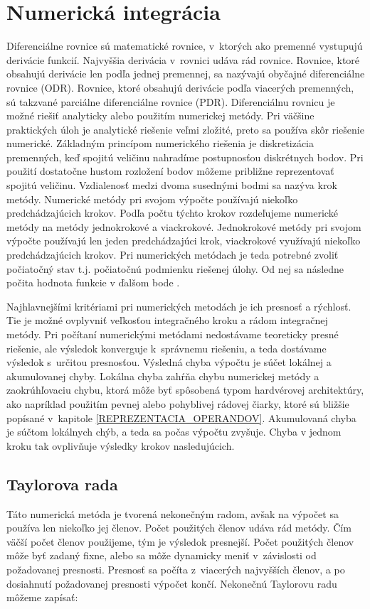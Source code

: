 \chapter{Numerická integrácia} \label{NUM_INTEGRACIA}


Diferenciálne rovnice sú matematické rovnice, v~ktorých ako premenné vystupujú derivácie funkcií. Najvyššia derivácia v~rovnici udáva rád rovnice. Rovnice, ktoré obsahujú derivácie len podľa jednej premennej, sa nazývajú obyčajné diferenciálne rovnice (ODR). Rovnice, ktoré obsahujú derivácie podľa viacerých premenných, sú takzvané parciálne diferenciálne rovnice (PDR).
Diferenciálnu rovnicu je možné riešiť analyticky alebo použitím numerickej metódy. Pri väčšine praktických úloh je analytické riešenie veľmi zložité, preto sa používa skôr riešenie numerické. Základným princípom numerického riešenia je diskretizácia premenných, keď spojitú veličinu nahradíme postupnosťou diskrétnych bodov. Pri použití dostatočne hustom rozložení bodov môžeme približne reprezentovať spojitú veličinu. Vzdialenosť medzi dvoma susednými bodmi sa nazýva krok metódy. Numerické metódy pri svojom výpočte používajú niekoľko predchádzajúcich krokov. Podľa počtu týchto krokov rozdeľujeme numerické metódy na metódy jednokrokové a viackrokové. Jednokrokové metódy pri svojom výpočte používajú len jeden predchádzajúci krok, viackrokové využívajú niekoľko predchádzajúcich krokov. Pri numerických metódach je teda potrebné zvoliť počiatočný stav t.j. počiatočnú podmienku riešenej úlohy. Od nej sa následne počita hodnota funkcie v ďalšom bode \cite{NumMetody}. 

Najhlavnejšími kritériami pri numerických metodách je ich presnosť a rýchlosť. Tie je možné ovplyvniť veľkosťou integračného kroku a rádom integračnej metódy. Pri počítaní numerickými metódami nedostávame teoreticky presné riešenie, ale výsledok konverguje k~správnemu riešeniu, a teda dostávame výsledok s~určitou presnosťou. Výsledná chyba výpočtu je súčet lokálnej a akumulovanej chyby.  Lokálna chyba zahŕňa chybu numerickej metódy a zaokrúhľovaciu chybu, ktorá môže byť spôsobená typom hardvérovej architektúry, ako napríklad použitím pevnej alebo pohyblivej rádovej čiarky, ktoré sú bližšie popísané v~kapitole \ref{REPREZENTACIA_OPERANDOV}. Akumulovaná chyba je súčtom lokálnych chýb, a teda sa počas výpočtu zvyšuje. Chyba v jednom kroku tak ovplivňuje výsledky krokov nasledujúcich.


\section{Taylorova rada}
Táto numerická metóda je tvorená nekonečným radom, avšak na výpočet sa používa len niekoľko jej členov. Počet použitých členov udáva rád metódy. Čím väčší počet členov použijeme, tým je výsledok presnejší. Počet použitých členov môže byť zadaný fixne, alebo sa môže dynamicky meniť v~závislosti od požadovanej presnosti. Presnosť sa počíta z~viacerých najvyšších členov, a po dosiahnutí požadovanej presnosti výpočet končí.
Nekonečnú Taylorovu radu môžeme zapísať:

